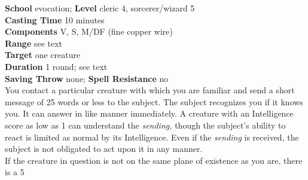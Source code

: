 \textbf{School} evocation; \textbf{Level} cleric 4, sorcerer/wizard 5\\
\textbf{Casting Time} 10 minutes\\
\textbf{Components} V, S, M/DF (fine copper wire)\\
\textbf{Range} see text\\
\textbf{Target} one creature\\
\textbf{Duration} 1 round; see text\\
\textbf{Saving Throw} none; \textbf{Spell Resistance} no\\
You contact a particular creature with which you are familiar and send a short message of 25 words or less to the subject. The subject recognizes you if it knows you. It can answer in like manner immediately. A creature with an Intelligence score as low as 1 can understand the \textit{sending, }though the subject's ability to react is limited as normal by its Intelligence. Even if the \textit{sending }is received, the subject is not obligated to act upon it in any manner.\\
If the creature in question is not on the same plane of existence as you are, there is a 5%
